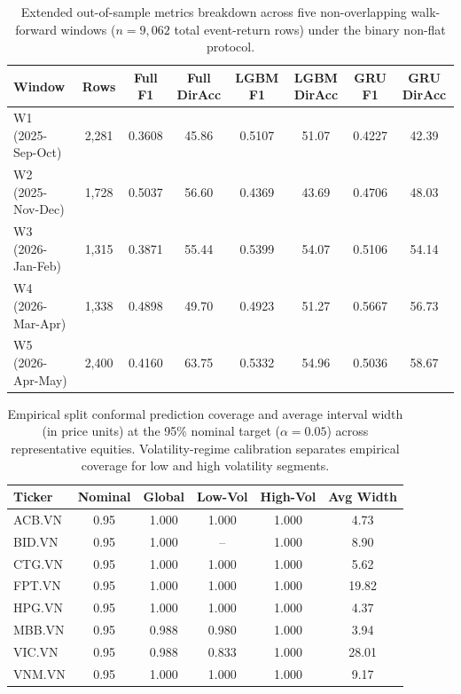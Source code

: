 \begin{table}[htbp]
\centering
\setlength{\tabcolsep}{4pt}
\caption{Extended out-of-sample metrics breakdown across five non-overlapping walk-forward windows ($n=9{,}062$ total event-return rows) under the binary non-flat protocol.}
\label{tab:extended_wf}
\small
\begin{tabular}{lccccccc}
\toprule
Window & Rows & Full F1 & Full DirAcc & LGBM F1 & LGBM DirAcc & GRU F1 & GRU DirAcc \\
\midrule
W1 (2025-Sep-Oct) & 2,281 & 0.3608 & 45.86 & 0.5107 & 51.07 & 0.4227 & 42.39 \\
W2 (2025-Nov-Dec) & 1,728 & 0.5037 & 56.60 & 0.4369 & 43.69 & 0.4706 & 48.03 \\
W3 (2026-Jan-Feb) & 1,315 & 0.3871 & 55.44 & 0.5399 & 54.07 & 0.5106 & 54.14 \\
W4 (2026-Mar-Apr) & 1,338 & 0.4898 & 49.70 & 0.4923 & 51.27 & 0.5667 & 56.73 \\
W5 (2026-Apr-May) & 2,400 & 0.4160 & 63.75 & 0.5332 & 54.96 & 0.5036 & 58.67 \\
\bottomrule
\end{tabular}
\end{table}

\begin{table}[H]
\centering
\setlength{\tabcolsep}{4pt}
\caption{Empirical split conformal prediction coverage and average interval width (in price units) at the 95\% nominal target ($\alpha = 0.05$) across representative equities. Volatility-regime calibration separates empirical coverage for low and high volatility segments.}
\label{tab:conformal}
\small
\begin{tabular}{lccccc}
\toprule
Ticker & Nominal & Global & Low-Vol & High-Vol & Avg Width \\
\midrule
ACB.VN & 0.95 & 1.000 & 1.000 & 1.000 & 4.73 \\
BID.VN & 0.95 & 1.000 & -- & 1.000 & 8.90 \\
CTG.VN & 0.95 & 1.000 & 1.000 & 1.000 & 5.62 \\
FPT.VN & 0.95 & 1.000 & 1.000 & 1.000 & 19.82 \\
HPG.VN & 0.95 & 1.000 & 1.000 & 1.000 & 4.37 \\
MBB.VN & 0.95 & 0.988 & 0.980 & 1.000 & 3.94 \\
VIC.VN & 0.95 & 0.988 & 0.833 & 1.000 & 28.01 \\
VNM.VN & 0.95 & 1.000 & 1.000 & 1.000 & 9.17 \\
\bottomrule
\end{tabular}
\end{table}
